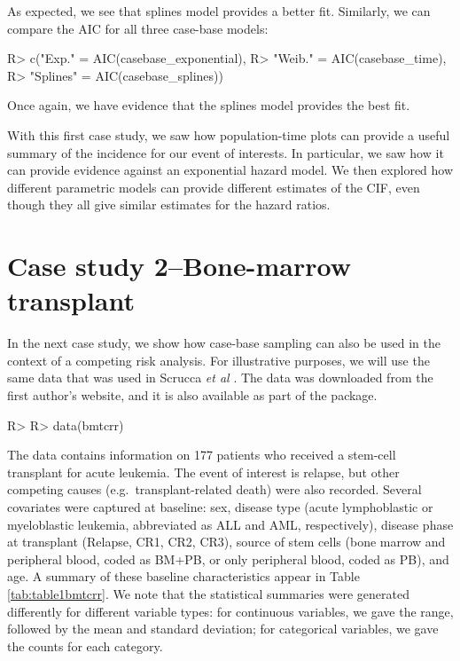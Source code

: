 \documentclass[
]{jss}
\begin{document}
As expected, we see that splines model provides a better fit. Similarly,
we can compare the AIC for all three case-base models:

\begin{CodeChunk}

\begin{CodeInput}
R> c("Exp." = AIC(casebase_exponential),
R>   "Weib." = AIC(casebase_time),
R>   "Splines" = AIC(casebase_splines))
\end{CodeInput}
\end{CodeChunk}

Once again, we have evidence that the splines model provides the best
fit.

With this first case study, we saw how population-time plots can provide
a useful summary of the incidence for our event of interests. In
particular, we saw how it can provide evidence against an exponential
hazard model. We then explored how different parametric models can
provide different estimates of the CIF, even though they all give
similar estimates for the hazard ratios.

\hypertarget{case-study-2bone-marrow-transplant}{%
\section{Case study 2--Bone-marrow
transplant}\label{case-study-2bone-marrow-transplant}}

In the next case study, we show how case-base sampling can also be used
in the context of a competing risk analysis. For illustrative purposes,
we will use the same data that was used in Scrucca \emph{et al}
\citeyearpar{scrucca2010regression}. The data was downloaded from the
first author's website, and it is also available as part of the
 package.

\begin{CodeChunk}

\begin{CodeInput}
R> 
R> data(bmtcrr)
\end{CodeInput}
\end{CodeChunk}

The data contains information on 177 patients who received a stem-cell
transplant for acute leukemia. The event of interest is relapse, but
other competing causes (e.g.~transplant-related death) were also
recorded. Several covariates were captured at baseline: sex, disease
type (acute lymphoblastic or myeloblastic leukemia, abbreviated as ALL
and AML, respectively), disease phase at transplant (Relapse, CR1, CR2,
CR3), source of stem cells (bone marrow and peripheral blood, coded as
BM+PB, or only peripheral blood, coded as PB), and age. A summary of
these baseline characteristics appear in Table \ref{tab:table1bmtcrr}.
We note that the statistical summaries were generated differently for
different variable types: for continuous variables, we gave the range,
followed by the mean and standard deviation; for categorical variables,
we gave the counts for each category.
\end{document}
